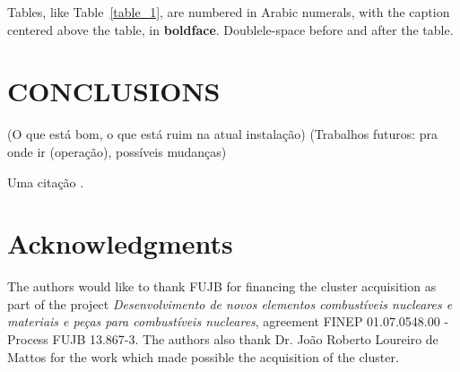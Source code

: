 \documentclass[twoside,a4paper,12pt,english,draft]{inac17}
\begin{document}
Tables, like Table~\ref{table_1}, are numbered in Arabic numerals, with the caption centered above the table, in {\bf boldface}.  Doublele-space before and after the table.


\section{CONCLUSIONS}

(O que está bom, o que está ruim na atual instalação)
(Trabalhos futuros: pra onde ir (operação), possíveis mudanças)

Uma citação \cite{Henderson17}.


\section*{Acknowledgments}
The authors would like to thank FUJB for financing the cluster acquisition
as part of the project \textit{Desenvolvimento de novos elementos combust\'{i}veis nucleares
  e materiais e pe\c{c}as para combust\'{i}veis nucleares}, agreement FINEP 01.07.0548.00 - Process FUJB 13.867-3.
The authors also thank Dr. Jo\~{a}o Roberto Loureiro de Mattos for the work which made possible the acquisition
of the cluster.











\end{document}
